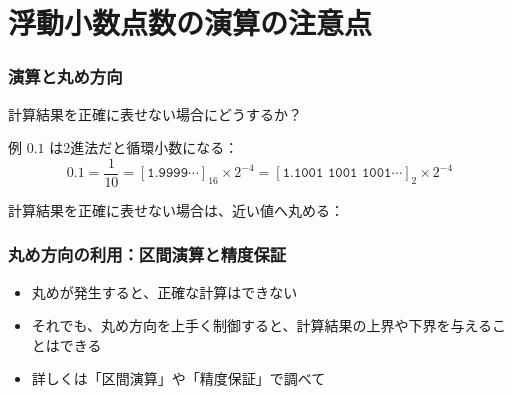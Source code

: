 \documentclass[aspectratio=169]{beamer}
\newcommand{\hexa}[1]{[\texttt{#1}]_{16}}
\newcommand{\binary}[1]{[\texttt{#1}]_{2}}
\begin{document}
\section{浮動小数点数の演算の注意点}
\begin{frame}\frametitle{演算と丸め方向}
  計算結果を正確に表せない場合にどうするか？

  \begin{block}{例}
    \(0.1\) は2進法だと循環小数になる：
    \[0.1=\frac{1}{10}=\hexa{1.9999\(\cdots\)}\times 2^{-4}=\binary{1.1001 1001 1001\(\cdots\)}\times 2^{-4}\]
  \end{block}

  計算結果を正確に表せない場合は、近い値へ丸める：
\end{frame}

\begin{frame}\frametitle{丸め方向の利用：区間演算と精度保証}
  \begin{itemize}
  \item 丸めが発生すると、正確な計算はできない
  \item それでも、丸め方向を上手く制御すると、計算結果の上界や下界を与えることはできる
  \item 詳しくは「区間演算」や「精度保証」で調べて
  \end{itemize}
\end{frame}
\end{document}
